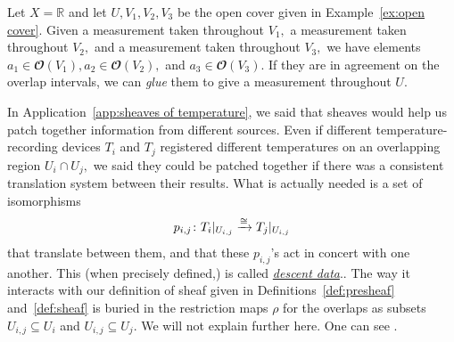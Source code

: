 \documentclass[../main/CT4S-EN-RU]{subfiles}
\begin{document}
\begin{definitionRUS}\label{def:sheaf}
\end{definitionRUS}

\begin{exampleENG}
Let $X={ℝ}$ and let $U, V_1,V_2,V_3$ be the open cover given in Example~\ref{ex:open cover}. Given a measurement taken throughout $V_1,$ a measurement taken throughout $V_2,$ and a measurement taken throughout $V_3,$ we have elements $a_1\in{𝓞}(V_1), a_2\in{𝓞}(V_2),$ and $a_3\in{𝓞}(V_3).$ If they are in agreement on the overlap intervals, we can {\em glue}  them to give a measurement throughout $U.$
\end{exampleENG}

\begin{exampleRUS}
\end{exampleRUS}

\begin{remarkENG}
In Application~\ref{app:sheaves of temperature}, we said that sheaves would help us patch together information from different sources. Even if different temperature-recording devices $T_i$ and $T_j$ registered different temperatures on an overlapping region $U_i\cap U_j,$ we said they could be patched together if there was a consistent translation system between their results. What is actually needed is a set of isomorphisms 
$$p_{i,j}\colon T_i|_{U_{i,j}}\xrightarrow{\cong} T_j|_{U_{i,j}}$$ 
that translate between them, and that these $p_{i,j}$'s act in concert with one another. This (when precisely defined,) is called \href{http://en.wikipedia.org/wiki/Descent_theory}{\em descent data}.. The way it interacts with our definition of sheaf given in Definitions~\ref{def:presheaf} and~\ref{def:sheaf} is buried in the restriction maps $\rho$ for the overlaps as subsets $U_{i,j}\subseteq U_i$ and $U_{i,j}\subseteq U_j.$ We will not explain further here. One can see \cite{Gro}.
\end{remarkENG}

\begin{remarkRUS}
\end{remarkRUS}
\end{document}
